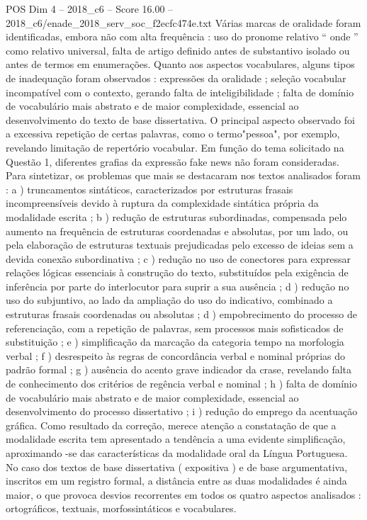 \begin{textsample}{POS Dim 4 – 2018\_c6 – Score 16.00 – 2018\_c6/enade\_2018\_serv\_soc\_f2ecfc474e.txt}
Várias marcas de oralidade foram identificadas, embora não com alta frequência : uso do pronome relativo “ onde ” como relativo universal, falta de artigo definido antes de substantivo isolado ou antes de termos em enumerações.
Quanto aos aspectos vocabulares, alguns tipos de inadequação foram observados : expressões da oralidade ; seleção vocabular incompatível com o contexto, gerando falta de inteligibilidade ; falta de domínio de vocabulário mais abstrato e de maior complexidade, essencial ao desenvolvimento do texto de base dissertativa.
O principal aspecto observado foi a excessiva repetição de certas palavras, como o termo"pessoa", por exemplo, revelando limitação de repertório vocabular.
Em função do tema solicitado na Questão 1, diferentes grafias da expressão fake news não foram consideradas.
Para sintetizar, os problemas que mais se destacaram nos textos analisados foram : a ) truncamentos sintáticos, caracterizados por estruturas frasais incompreensíveis devido à ruptura da complexidade sintática própria da modalidade escrita ; b ) redução de estruturas subordinadas, compensada pelo aumento na frequência de estruturas coordenadas e absolutas, por um lado, ou pela elaboração de estruturas textuais prejudicadas pelo excesso de ideias sem a devida conexão subordinativa ; c ) redução no uso de conectores para expressar relações lógicas essenciais à construção do texto, substituídos pela exigência de inferência por parte do interlocutor para suprir a sua ausência ; d ) redução no uso do subjuntivo, ao lado da ampliação do uso do indicativo, combinado a estruturas frasais coordenadas ou absolutas ; d ) empobrecimento do processo de referenciação, com a repetição de palavras, sem processos mais sofisticados de substituição ; e ) simplificação da marcação da categoria tempo na morfologia verbal ; f ) desrespeito às regras de concordância verbal e nominal próprias do padrão formal ; g ) ausência do acento grave indicador da crase, revelando falta de conhecimento dos critérios de regência verbal e nominal ; h ) falta de domínio de vocabulário mais abstrato e de maior complexidade, essencial ao desenvolvimento do processo dissertativo ; i ) redução do emprego da acentuação gráfica.
Como resultado da correção, merece atenção a constatação de que a modalidade escrita tem apresentado a tendência a uma evidente simplificação, aproximando -se das características da modalidade oral da Língua Portuguesa.
No caso dos textos de base dissertativa ( expositiva ) e de base argumentativa, inscritos em um registro formal, a distância entre as duas modalidades é ainda maior, o que provoca desvios recorrentes em todos os quatro aspectos analisados : ortográficos, textuais, morfossintáticos e vocabulares.

\end{textsample}
